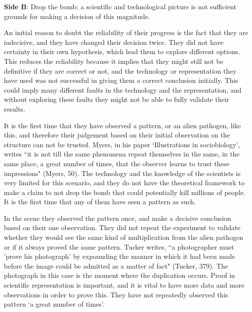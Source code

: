 \documentclass[11pt, oneside]{article}
\begin{document}

\newpage


\noindent \textbf{Side B}: Drop the bomb: a scientific and technological picture is not sufficient grounds for making a decision of this magnitude.


\par An initial reason to doubt the reliability of their progress is the fact that they are indecisive, and they have changed their decision twice. They did not have certainty in their own hypothesis, which lead them to explore different options. This reduces the reliability because it implies that they might still not be definitive if they are correct or not, and the technology or representation they have used was not successful in giving them a correct conclusion initially. This could imply many different faults in the technology and the representation, and without exploring these faults they might not be able to fully validate their results.


\par It is the first time that they have observed a pattern, or an alien pathogen, like this, and therefore their judgement based on their initial observation on the structure can not be trusted. Myers, in his paper `Illustrations in sociobiology', writes ``it is not till the same phenomena repeat themselves in the same, in the same place, a great number of times, that the observer learns to trust these impressions" (Myers, 50). The technology and the knowledge of the scientists is very limited for this scenario, and they do not have the theoretical framework to make a claim to not drop the bomb that could potentially kill millions of people. It is the first time that any of them have seen a pattern as such.


\par In the scene they observed the pattern once, and make a decisive conclusion based on their one observation. They did not repeat the experiment to validate whether they would see the same kind of multiplication from the alien pathogen or if it always proved the same pattern. Tucker writes, ``a photographer must 'prove his photograph' by expounding the manner in which it had been made before the image could be admitted as a matter of fact" (Tucker, 379). The photograph in this case is the moment where the duplication occurs. Proof in scientific representation is important, and it is vital to have more data and more observations in order to prove this. They have not repeatedly observed this pattern `a great number of times'.
\end{document}
